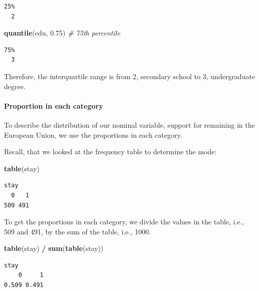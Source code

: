 \documentclass[]{article}
\newenvironment{Shaded}{\begin{snugshade}}{\end{snugshade}}
\newcommand{\CommentTok}[1]{\textcolor[rgb]{0.56,0.35,0.01}{\textit{#1}}}
\newcommand{\FloatTok}[1]{\textcolor[rgb]{0.00,0.00,0.81}{#1}}
\newcommand{\KeywordTok}[1]{\textcolor[rgb]{0.13,0.29,0.53}{\textbf{#1}}}
\newcommand{\NormalTok}[1]{#1}
\newcommand{\OperatorTok}[1]{\textcolor[rgb]{0.81,0.36,0.00}{\textbf{#1}}}
\newcommand{\StringTok}[1]{\textcolor[rgb]{0.31,0.60,0.02}{#1}}
\let\oldparagraph\paragraph
\renewcommand{\paragraph}[1]{\oldparagraph{#1}\mbox{}}
\begin{document}
\begin{verbatim}
25% 
  2 
\end{verbatim}

\begin{Shaded}
\begin{Highlighting}[]
\KeywordTok{quantile}\NormalTok{(edu, }\FloatTok{0.75}\NormalTok{) }\CommentTok{# 75th percentile}
\end{Highlighting}
\end{Shaded}

\begin{verbatim}
75% 
  3 
\end{verbatim}

Therefore, the interquartile range is from 2, secondary school to 3, undergraduate degree.

\hypertarget{proportion-in-each-category}{%
\paragraph{Proportion in each category}\label{proportion-in-each-category}}

To describe the distribution of our nominal variable, support for remaining in the European Union, we use the proportions in each category.

Recall, that we looked at the frequency table to determine the mode:

\begin{Shaded}
\begin{Highlighting}[]
\KeywordTok{table}\NormalTok{(stay)}
\end{Highlighting}
\end{Shaded}

\begin{verbatim}
stay
  0   1 
509 491 
\end{verbatim}

To get the proportions in each category, we divide the values in the table, i.e., 509 and 491, by the sum of the table, i.e., 1000.

\begin{Shaded}
\begin{Highlighting}[]
\KeywordTok{table}\NormalTok{(stay) }\OperatorTok{/}\StringTok{ }\KeywordTok{sum}\NormalTok{(}\KeywordTok{table}\NormalTok{(stay))}
\end{Highlighting}
\end{Shaded}

\begin{verbatim}
stay
    0     1 
0.509 0.491 
\end{verbatim}
\end{document}
